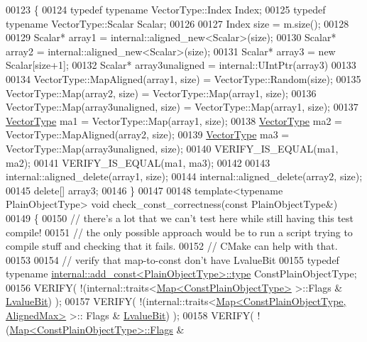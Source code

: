 \begin{DoxyCode}
00123 \{
00124   \textcolor{keyword}{typedef} \textcolor{keyword}{typename} VectorType::Index Index;
00125   \textcolor{keyword}{typedef} \textcolor{keyword}{typename} VectorType::Scalar Scalar;
00126 
00127   Index size = m.size();
00128 
00129   Scalar* array1 = internal::aligned\_new<Scalar>(size);
00130   Scalar* array2 = internal::aligned\_new<Scalar>(size);
00131   Scalar* array3 = \textcolor{keyword}{new} Scalar[size+1];
00132   Scalar* array3unaligned = internal::UIntPtr(array3)%
00133 
00134   VectorType::MapAligned(array1, size) = VectorType::Random(size);
00135   VectorType::Map(array2, size) = VectorType::Map(array1, size);
00136   VectorType::Map(array3unaligned, size) = VectorType::Map(array1, size);
00137   \hyperlink{struct_vector_type}{VectorType} ma1 = VectorType::Map(array1, size);
00138   \hyperlink{struct_vector_type}{VectorType} ma2 = VectorType::MapAligned(array2, size);
00139   \hyperlink{struct_vector_type}{VectorType} ma3 = VectorType::Map(array3unaligned, size);
00140   VERIFY\_IS\_EQUAL(ma1, ma2);
00141   VERIFY\_IS\_EQUAL(ma1, ma3);
00142 
00143   internal::aligned\_delete(array1, size);
00144   internal::aligned\_delete(array2, size);
00145   \textcolor{keyword}{delete}[] array3;
00146 \}
00147 
00148 \textcolor{keyword}{template}<\textcolor{keyword}{typename} PlainObjectType> \textcolor{keywordtype}{void} check\_const\_correctness(\textcolor{keyword}{const} PlainObjectType&)
00149 \{
00150   \textcolor{comment}{// there's a lot that we can't test here while still having this test compile!}
00151   \textcolor{comment}{// the only possible approach would be to run a script trying to compile stuff and checking that it
       fails.}
00152   \textcolor{comment}{// CMake can help with that.}
00153 
00154   \textcolor{comment}{// verify that map-to-const don't have LvalueBit}
00155   \textcolor{keyword}{typedef} \textcolor{keyword}{typename} \hyperlink{group___core___module_class_eigen_1_1_transpose}{internal::add\_const<PlainObjectType>::type} 
      ConstPlainObjectType;
00156   VERIFY( !(internal::traits<\hyperlink{group___core___module_class_eigen_1_1_map}{Map<ConstPlainObjectType>} >::Flags & 
      \hyperlink{group__flags_gae2c323957f20dfdc6cb8f44428eaec1a}{LvalueBit}) );
00157   VERIFY( !(internal::traits<\hyperlink{group___core___module_class_eigen_1_1_map}{Map<ConstPlainObjectType, AlignedMax>} >::
      Flags & \hyperlink{group__flags_gae2c323957f20dfdc6cb8f44428eaec1a}{LvalueBit}) );
00158   VERIFY( !(\hyperlink{group___core___module_class_eigen_1_1_map}{Map<ConstPlainObjectType>::Flags} & 

\end{DoxyCode}
